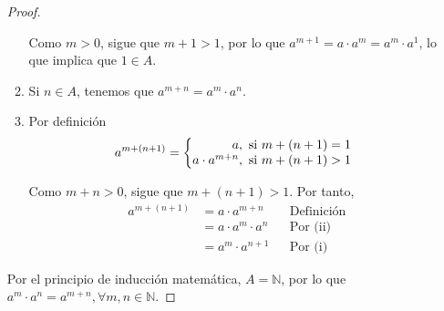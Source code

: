 \documentclass[11pt]{article}
\newcommand{\N}{\mathbb{N}}
\begin{document}
\begin{enumerate}[label=\alph*)]
\begin{proof}
\begin{enumerate}[label=\roman*)]
        Como $m>0$, sigue que $m+1>1$, por lo que $a^{m+1}=a\cdot a^m=a^m\cdot a^1$, lo que implica que $1\in A$.
    \item Si $n\in A$, tenemos que $a^{m+n}=a^m\cdot a^n$.
    \item Por definición \vspace{1em}\begin{align*}
        a^{m+(n+1)} = \left\{
            \begin{array}{@{}r@{\thinspace}l}
                a, &  \ \text{si}  \ m+(n+1) = 1\\
                a\cdot a^{m+n}, &  \ \text{si}  \ m+(n+1) > 1
            \end{array} \right.
        \end{align*}\vspace{-1em}

    Como $m+n>0$, sigue que $m+(n+1)>1$. Por tanto, \vspace{1em}\begin{align*}
        a^{m+(n+1)} &=a\cdot a^{m+n} && \text{Definición}\\
        &= a\cdot a^m \cdot a^n && \text{Por (ii)}\\
        &= a^m \cdot a^{n+1} && \text{Por (i)}
    \end{align*}\vspace{-1em}
    \end{enumerate}\vspace{-1em}

    Por el principio de inducción matemática, $A=\N$, por lo que $a^m \cdot a^n = a^{m+n}, \forall m,n\in \N$.
    \end{proof} \vspace{-1em}


\end{enumerate}
\end{document}
